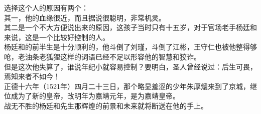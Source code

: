 \begin{multicols}{\theparacolNo}
选择这个人的原因有两个：\\

其一，他的血缘很近，而且据说很聪明，非常机灵。\\

其二是一个不大方便说出来的原因，这孩子当时只有十五岁，对于官场老手杨廷和来说，这是一个比较好控制的人。\\

杨廷和的前半生是十分顺利的，他斗倒了刘瑾，斗倒了江彬，王守仁也被他整得够呛，老油条老狐狸这样的词语已经不足以形容他的智慧和狡诈。\\

但是这次他失算了，谁说年纪小就容易控制？要明白，圣人曾经说过：后生可畏，焉知来者不如今！\\

正德十六年（1521年）四月二十三日，那个略显羞涩的少年朱厚熜来到了京城，继位成为了新的皇帝，改明年为嘉靖元年，是为嘉靖皇帝。\\

战无不胜的杨廷和先生那辉煌的前景和未来就将断送在他的手上。\\
\ifnum{}
	\end{multicols}
\fi
